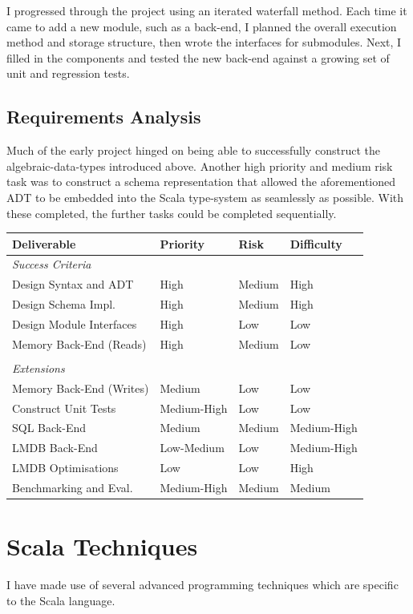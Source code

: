 \documentclass[12pt,a4paper,twoside,openright]{report}
\begin{document}
I progressed through the project using an iterated waterfall method. Each time it came to add a new module, such as a back-end, I planned the overall execution method and storage structure, then wrote the interfaces for submodules. Next, I filled in the components and tested the new back-end against a growing set of unit and regression tests.

\subsection{Requirements Analysis}
Much of the early project hinged on being able to successfully construct the algebraic-data-types introduced above. Another high priority and medium risk task was to construct a schema representation that allowed the aforementioned ADT to be embedded into the Scala type-system as seamlessly as possible. With these completed, the further tasks could be completed sequentially.

\begin{tabular}{p{5cm}p{3cm}p{2cm}p{3cm}}
\\
\hline
Deliverable & Priority & Risk & Difficulty \\
\hline
\textit{Success Criteria}\\
Design Syntax and ADT & High & Medium & High \\
Design Schema Impl. & High & Medium & High \\
Design Module Interfaces & High & Low & Low \\
Memory Back-End (Reads) & High & Medium & Low \\
\\
\hline
\textit{Extensions}\\
Memory Back-End (Writes) & Medium & Low & Low \\
Construct Unit Tests & Medium-High & Low & Low\\
SQL Back-End & Medium & Medium & Medium-High \\
LMDB Back-End & Low-Medium & Low & Medium-High \\
LMDB Optimisations & Low & Low & High \\
Benchmarking and Eval. & Medium-High & Medium & Medium
\\
\hline

\end{tabular}

\section{Scala Techniques}
I have made use of several advanced programming techniques which are specific to the Scala language.
\end{document}
